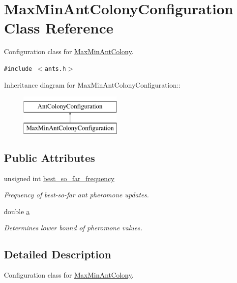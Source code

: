 \hypertarget{classMaxMinAntColonyConfiguration}{
\section{MaxMinAntColonyConfiguration Class Reference}
\label{classMaxMinAntColonyConfiguration}
}
Configuration class for \hyperlink{classMaxMinAntColony}{MaxMinAntColony}.  


{\tt \#include $<$ants.h$>$}

Inheritance diagram for MaxMinAntColonyConfiguration::\begin{figure}[H]
\begin{center}
\leavevmode
\includegraphics[height=2cm]{classMaxMinAntColonyConfiguration}
\end{center}
\end{figure}
\subsection*{Public Attributes}
\begin{CompactItemize}
\item 
unsigned int \hyperlink{classMaxMinAntColonyConfiguration_4802ab01d7e73b5f31142679da63451a}{best\_\-so\_\-far\_\-frequency}
\begin{CompactList}\small\item\em Frequency of best-so-far ant pheromone updates. \item\end{CompactList}\item 
double \hyperlink{classMaxMinAntColonyConfiguration_ee28a7e4653e607c047b87f68ea73143}{a}
\begin{CompactList}\small\item\em Determines lower bound of pheromone values. \item\end{CompactList}\end{CompactItemize}


\subsection{Detailed Description}
Configuration class for \hyperlink{classMaxMinAntColony}{MaxMinAntColony}. 

